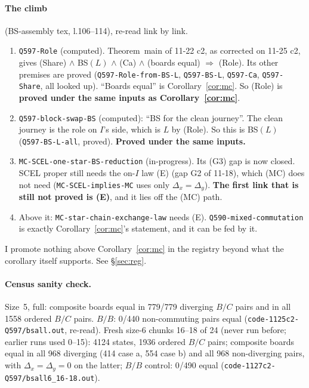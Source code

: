 \documentclass[11pt]{article}
\theoremstyle{definition}\newtheorem{definition}[theorem]{Definition}\newtheorem{remark}[theorem]{Remark}
\begin{document}
\paragraph{The climb} (BS-assembly tex, l.106--114), re-read link by link.
\begin{enumerate}
\item \texttt{Q597-Role} (computed). Theorem~main of 11-22 c2, as corrected on 11-25 c2, gives (Share) $\wedge$ BS$(L)$ $\wedge$ (Ca) $\wedge$ (boards equal) $\Rightarrow$ (Role). Its other premises are proved (\texttt{Q597-Role-from-BS-L}, \texttt{Q597-BS-L}, \texttt{Q597-Ca}, \texttt{Q597-Share}, all looked up). ``Boards equal'' is Corollary~\ref{cor:mc}. So (Role) is \textbf{proved under the same inputs as Corollary~\ref{cor:mc}}.
\item \texttt{Q597-block-swap-BS} (computed): ``BS for the clean journey''. The clean journey is the role on $I$'s side, which is $L$ by (Role). So this is BS$(L)$ (\texttt{Q597-BS-L-all}, proved). \textbf{Proved under the same inputs.}
\item \texttt{MC-SCEL-one-star-BS-reduction} (in-progress). Its (G3) gap is now closed. SCEL proper still needs the on-$I$ law (E) (gap G2 of 11-18), which (MC) does not need (\texttt{MC-SCEL-implies-MC} uses only $\Delta_x=\Delta_y$). \textbf{The first link that is still not proved is (E)}, and it lies off the (MC) path.
\item Above it: \texttt{MC-star-chain-exchange-law} needs (E). \texttt{Q590-mixed-commutation} is exactly Corollary~\ref{cor:mc}'s statement, and it can be fed by it.
\end{enumerate}
I promote nothing above Corollary~\ref{cor:mc} in the registry beyond what the corollary itself supports. See \S\ref{sec:reg}.

\paragraph{Census sanity check.} Size~5, full: composite boards equal in 779/779 diverging $B/C$ pairs and in all 1558 ordered $B/C$ pairs. $B/B$: 0/440 non-commuting pairs equal (\texttt{code-1125c2-Q597/bsall.out}, re-read). Fresh size-6 chunks 16--18 of 24 (never run before; earlier runs used 0--15): 4124 states, 1936 ordered $B/C$ pairs; composite boards equal in all 968 diverging (414 case a, 554 case b) and all 968 non-diverging pairs, with $\Delta_x=\Delta_y=0$ on the latter; $B/B$ control: 0/490 equal (\texttt{code-1127c2-Q597/bsall6\_16-18.out}).
\end{document}
